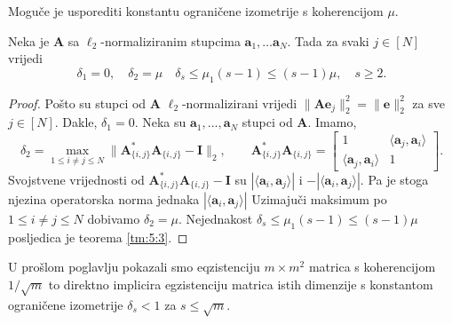 \documentclass[a4paper,twoside,12pt]{memoir} %
\newcommand{\vect}[1]{\mathbf{#1}}
\renewcommand{\vec}{\vect}
\newcommand{\norm}[1]{\|{#1}\|}
\begin{document}
Mogu\v{c}e je usporediti konstantu ograni\v{c}ene izometrije s koherencijom $\mu$.
\begin{prop}\label{prop:6:2}
    Neka je $\vec A$ sa $\ell_2$-normaliziranim stupcima $\vec a_1, \dots \vec a_N$. Tada za svaki $j \in [N]$ vrijedi
    \begin{equation*}
        \delta_1 = 0, \quad \delta_2 = \mu \quad \delta_s \leq \mu_1(s-1) \leq (s-1)\mu, \quad s \geq 2. 
    \end{equation*}
\end{prop}
\begin{proof}
    Po\v{s}to su stupci od $\vec A$ $\ell_2$-normalizirani vrijedi $\norm{\vec{Ae}_j}_2^2 = \norm{\vec e}_2^2$ za sve $j \in [N]$. Dakle, $\delta_1 = 0$. Neka su $\vec a_1, \dots, \vec a_N$ stupci od $\vec A$. Imamo,
    \begin{equation}
        \delta_2 = \max_{1 \leq i \neq j \leq N} \norm{\vec A^*_{\{i,j\}}\vec A_{\{i,j\}} - \vec I}_2, \quad \quad \vec A^*_{\{i,j\}}\vec A_{\{i,j\}} = 
        \begin{bmatrix*}
            1 & \langle \vec a_j, \vec a_i \rangle \\
            \langle \vec a_j, \vec a_i \rangle  & 1
        \end{bmatrix*}.
    \end{equation}
    Svojstvene vrijednosti od $\vec A^*_{\{i,j\}}\vec A_{\{i,j\}} - \vec I$ su $|\langle \vec a_i, \vec a_j \rangle |$ i $-|\langle \vec a_i, \vec a_j \rangle |$. Pa je stoga njezina operatorska norma jednaka $|\langle \vec a_i, \vec a_j \rangle |$ Uzimaju\v{c}i maksimum po $1 \leq i \neq j \leq N$ dobivamo $\delta_2 = \mu$. Nejednakost $\delta_s \leq \mu_1(s-1) \leq (s-1)\mu$ posljedica je teorema \ref{tm:5:3}.
\end{proof}

U pro\v{s}lom poglavlju pokazali smo eqzistenciju $m \times m^2$ matrica s koherencijom $1/\sqrt{m}$ to direktno implicira egzistenciju matrica istih dimenzije s konstantom ograni\v{c}ene izometrije $\delta_s < 1$ za $s \leq \sqrt{m}$.
\end{document}
